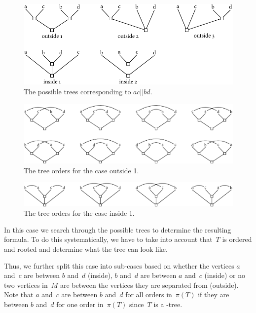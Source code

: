 \begin{figure}\centering
    \includegraphics[scale=.9]{figures/t_order_ab_cd}
    \caption[Trees for $ac||bd$]{The possible trees corresponding to $ac||bd$.}
    \label{figure:order_ab_cd}
\end{figure}
\begin{figure}\centering
    \includegraphics[width=\textwidth]{figures/t_topo_ac_bd}
    \caption[Outside 1 tree orders]{The tree orders for the case outside 1.}
    \label{figure:topo_ac_bd}
\end{figure}
\begin{figure}\centering
    \includegraphics[width=\textwidth]{figures/t_topo_b_ac_d}
    \caption[Inside 1 tree orders]{The tree orders for the case inside 1.}
    \label{figure:topo_b_ac_d}
\end{figure}

In this case we search through the possible trees to determine the resulting
\probTwoSat formula. To do this systematically, we have to take into account that~$T$ is ordered and rooted and determine what the tree can look like. 

Thus, we further split this case into sub-cases based on whether the vertices $a$ and~$c$ are between $b$ and~$d$ (inside), $b$ and~$d$ are between $a$ and~$c$ (inside) or no two vertices in~$M$ are between the vertices they are separated from (outside). Note that $a$ and~$c$ are between $b$ and~$d$
for all orders in~$\pi(T)$ if they are between $b$ and~$d$ for one order in~$\pi(T)$ since~$T$
is a \Q-tree.

